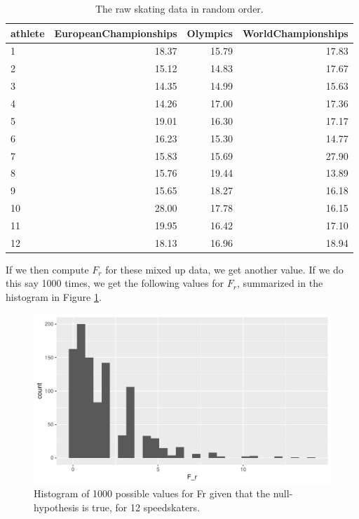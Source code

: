 \documentclass[]{book}\usepackage[]{graphicx}\usepackage[]{color}
\makeatletter
\def\maxwidth{ %
  \ifdim\Gin@nat@width>\linewidth
    \linewidth
  \else
    \Gin@nat@width
  \fi
}
\newenvironment{knitrout}{}{} %
\makeatother
\begin{document}
\begin{table}[ht]
\centering
\caption{The raw skating data in random order.} 
\label{tab:nonparmixed_26}
\begin{tabular}{lrrr}
  \hline
athlete & EuropeanChampionships & Olympics & WorldChampionships \\ 
  \hline
1 & 18.37 & 15.79 & 17.83 \\ 
  2 & 15.12 & 14.83 & 17.67 \\ 
  3 & 14.35 & 14.99 & 15.63 \\ 
  4 & 14.26 & 17.00 & 17.36 \\ 
  5 & 19.01 & 16.30 & 17.17 \\ 
  6 & 16.23 & 15.30 & 14.77 \\ 
  7 & 15.83 & 15.69 & 27.90 \\ 
  8 & 15.76 & 19.44 & 13.89 \\ 
  9 & 15.65 & 18.27 & 16.18 \\ 
  10 & 28.00 & 17.78 & 16.15 \\ 
  11 & 19.95 & 16.42 & 17.10 \\ 
  12 & 18.13 & 16.96 & 18.94 \\ 
   \hline
\end{tabular}
\end{table}


If we then compute $F_r$ for these mixed up data, we get another value. If we do this say 1000 times, we get the following values for $F_r$, summarized in the  histogram in Figure \ref{fig:nonparmixed_36}.


\begin{knitrout}
\color{fgcolor}\begin{figure}

{\centering \includegraphics[width=\maxwidth]{figure/nonparmixed_36-1} 

}

\caption[Histogram of 1000 possible values for Fr given that the null-hypothesis is true, for 12 speedskaters]{Histogram of 1000 possible values for Fr given that the null-hypothesis is true, for 12 speedskaters.}\label{fig:nonparmixed_36}
\end{figure}


\end{knitrout}
\end{document}
